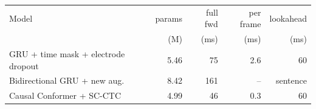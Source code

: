 \begin{tabular}{lrrrr}
\toprule
Model & params & full fwd & per frame & lookahead \\
 & (M) & (ms) & (ms) & (ms) \\
\midrule
GRU + time mask + electrode dropout & 5.46 & 75 & 2.6 & 60 \\
Bidirectional GRU + new aug. & 8.42 & 161 & -- & sentence \\
Causal Conformer + SC-CTC & 4.99 & 46 & 0.3 & 60 \\
\bottomrule
\end{tabular}